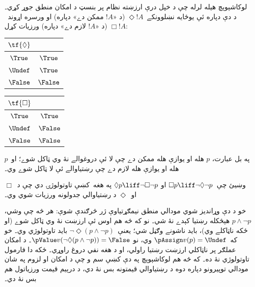 \documentclass[../../../include/open-logic-section]{subfiles}
\begin{document}
لوکاشېوېچ هيله لرله چې د خپل درې ارزښته نظام پر بنسټ د امکان
منطق جوړ کړي۔ د دې دپاره ئې يوځايه نښلوونکے~$\Diamond !A$
(د «$!A$ ممکن دے» دپاره) او ورسره اړوند~$\Box !A$
(د «$!A$ لازم دے» دپاره) ورزيات کړل:
\begin{center}
  \begin{tabular}{c|c} 
    $\tf{\Diamond}$ & \\ 
    \hline  
    $\True$ & $\True$ \\ 
    $\Undef$ & $\True$ \\
    $\False$ & $\False$ 
  \end{tabular}
  \quad
  \begin{tabular}{c|c} 
    $\tf{\Box}$ & \\ 
    \hline  
    $\True$ & $\True$ \\ 
    $\Undef$ & $\False$ \\
    $\False$ & $\False$ 
  \end{tabular}
\end{center}
په بل عبارت، $p$ هله او يوازې هله ممکن دے چې لا ئې دروغوالے
نۀ وي ټاکل شوے؛ او~$p$ هله او يوازې هله لازم دے چې رښتياوالے
ئې لا ټاکل شوے وي۔

\begin{prob}
  وښيئ چې~$\Box p \liff \lnot\Diamond \lnot p$ او
  $\Diamond p \liff \lnot \Box \lnot p$ په هغه~\LogLuk[3]
  کښې تاوتولوژۍ دي چې د~$\Box$ او~$\Diamond$ د
  رښتياوالي جدولونه ورزيات شوي وي۔
\end{prob}

خو د دې وړانديز شوي مودالي منطق نيمګړتياوې ژر څرګندې شوې:
هر څه چې وشي، $p \land \lnot p$ هېڅکله رښتيا کېدے نۀ شي۔
نو که څه هم اوس ئې ارزښت نۀ وي ټاکل شوے (او ځکه ناټاکلے وي)،
بايد ناشونے وګڼل شي؛ يعنې~$\lnot \Diamond(p \land \lnot p)$
بايد تاوتولوژي وي۔ خو که~$\pAssign v(p) = \Undef$ وي، نو
$\pValue v(\lnot \Diamond(p \land \lnot p)) = \False$۔
د امکان عملګر پر ناټاکلي ارزښت رښتيا راولي، او د هغه نفي دروغ راوړي۔ ځکه دا فارمول تاوتولوژي نۀ ده۔ که څه هم
لوکاشېوېچ په دې کښې سم و چې د امکان او لزوم په شان مودالي
توپيرونو دپاره دوه د رښتياوالي قيمتونه بس نۀ دي، د درېيم
قيمت ورزياتول هم بس نۀ دي۔
\end{document}
